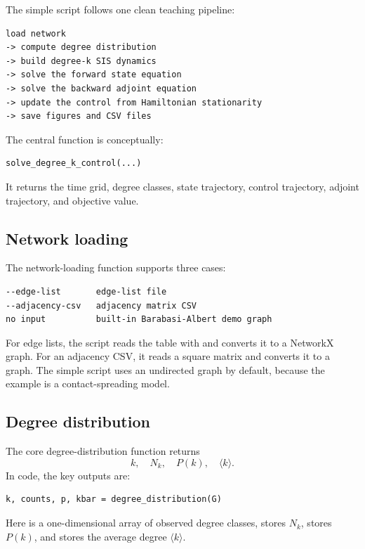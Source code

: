 \documentclass[11pt,a4paper]{article}
\DeclareRobustCommand{\code}[1]{\texttt{\detokenize{#1}}}
\begin{document}
The simple script follows one clean teaching pipeline:

\begin{lstlisting}[style=text]
load network
-> compute degree distribution
-> build degree-k SIS dynamics
-> solve the forward state equation
-> solve the backward adjoint equation
-> update the control from Hamiltonian stationarity
-> save figures and CSV files
\end{lstlisting}

The central function is conceptually:

\begin{lstlisting}[style=py]
solve_degree_k_control(...)
\end{lstlisting}

It returns the time grid, degree classes, state trajectory, control trajectory, adjoint trajectory, and objective value.

\subsection{Network loading}

The network-loading function supports three cases:

\begin{lstlisting}[style=text]
--edge-list       edge-list file
--adjacency-csv   adjacency matrix CSV
no input          built-in Barabasi-Albert demo graph
\end{lstlisting}

For edge lists, the script reads the table with \code{pandas.read_csv} and converts it to a NetworkX graph. For an adjacency CSV, it reads a square matrix and converts it to a graph. The simple script uses an undirected graph by default, because the example is a contact-spreading model.

\subsection{Degree distribution}

The core degree-distribution function returns
\[
  k,\quad N_k,\quad P(k),\quad \langle k\rangle.
\]
In code, the key outputs are:

\begin{lstlisting}[style=py]
k, counts, p, kbar = degree_distribution(G)
\end{lstlisting}

Here \code{k} is a one-dimensional array of observed degree classes, \code{counts} stores \(N_k\), \code{p} stores \(P(k)\), and \code{kbar} stores the average degree \(\langle k\rangle\).
\end{document}
